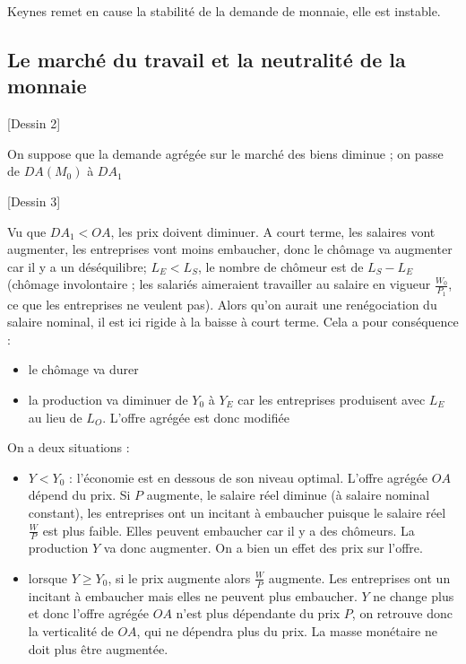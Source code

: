 	Keynes remet en cause la stabilité de la demande de monnaie, elle est instable.
	
	\subsection{Le marché du travail et la neutralité de la monnaie}
	
	[Dessin 2]
	
	On suppose que la demande agrégée sur le marché des biens diminue ; on passe de $DA(M_0)$ à $DA_1$
	
	[Dessin 3]
	
	Vu que $DA_1 < OA$, les prix doivent diminuer. A court terme, les salaires vont augmenter, les entreprises vont moins embaucher, donc le chômage va augmenter car il y a un déséquilibre; $L_E < L_S$, le nombre de chômeur est de $L_S - L_E$ (chômage involontaire ; les salariés aimeraient travailler au salaire en vigueur $\frac{W_0}{P_1}$, ce que les entreprises ne veulent pas). Alors qu'on aurait une renégociation du salaire nominal, il est ici rigide à la baisse à court terme. Cela a pour conséquence :
	
	\begin{itemize}
		\item le chômage va durer
		\item la production va diminuer de $Y_0$ à $Y_E$ car les entreprises produisent avec $L_E$ au lieu de $L_O$. L'offre agrégée est donc modifiée
	\end{itemize}
	
	On a deux situations :
	
	\begin{itemize}
		\item $Y < Y_0$ : l'économie est en dessous de son niveau optimal. L'offre agrégée $OA$ dépend du prix. Si $P$ augmente, le salaire réel diminue (à salaire nominal constant), les entreprises ont un incitant à embaucher puisque le salaire réel $\frac{W}{P}$ est plus faible. Elles peuvent embaucher car il y a des chômeurs. La production $Y$ va donc augmenter. On a bien un effet des prix sur l'offre.
		\item lorsque $Y \geq Y_0$, si le prix augmente alors $\frac{W}{P}$ augmente. Les entreprises ont un incitant à embaucher mais elles ne peuvent plus embaucher. $Y$ ne change plus et donc l'offre agrégée $OA$ n'est plus dépendante du prix $P$, on retrouve donc la verticalité de $OA$, qui ne dépendra plus du prix. La masse monétaire ne doit plus être augmentée.
	\end{itemize}
	
